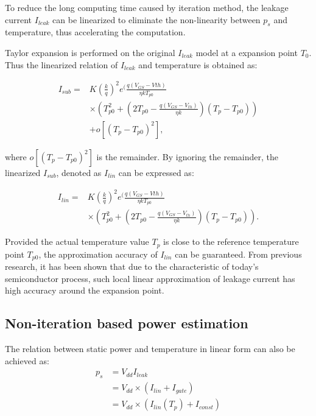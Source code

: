 To reduce the long computing time caused by iteration method, the leakage current $I_{leak}$ can be linearized to eliminate the non-linearity between $p_{s}$ and temperature, thus accelerating the computation.

Taylor expansion is performed on the original $I_{leak}$ model at a expansion point $T_{0}$. Thus the linearized relation of $I_{leak}$ and temperature is obtained as:

\begin{equation}\label{linear_subthreshold}
\begin{split}
I_{sub} = &K(\frac{k}{q})^{2}e^(\frac{q(V_{GS}-V{th})}{\eta kT_{p0}}\\
&\times (T_{p0}^{2}+(2T_{p0}-\frac{q(V_{GS}-V_{th})}{\eta k})(T_{p}-T_{p0}))\\
&+ o[(T_{p}-T_{p0})^{2}],
\end{split}
\end{equation}

where $o[(T_{p}-T_{p0})^{2}]$ is the remainder. By ignoring the remainder, the linearized $I_{sub}$, denoted as $I_{lin}$ can be expressed as:

\begin{equation}\label{linear_subthreshold}
\begin{split}
I_{lin} = &K(\frac{k}{q})^{2}e^(\frac{q(V_{GS}-V{th})}{\eta kT_{p0}}\\
&\times (T_{p0}^{2}+(2T_{p0}-\frac{q(V_{GS}-V_{th})}{\eta k})(T_{p}-T_{p0})).
\end{split}
\end{equation}

Provided the actual temperature value $T_{p}$ is close to the reference temperature point $T_{p0}$, the approximation accuracy of $I_{lin}$ can be guaranteed. From previous research, it has been shown that due to the characteristic of today's semiconductor process, such local linear approximation of leakage current has high accuracy around the expansion point.

\subsection{Non-iteration based power estimation}
The relation between static power and temperature in linear form can also be achieved as:
\begin{equation}\label{linear_static}
\begin{split}
p_{s} &= V_{dd}I_{leak}\\
&= V_{dd} \times (I_{lin}+I_{gate})\\
&= V_{dd} \times (I_{lin}(T_{p})+I_{const})
\end{split}
\end{equation}

